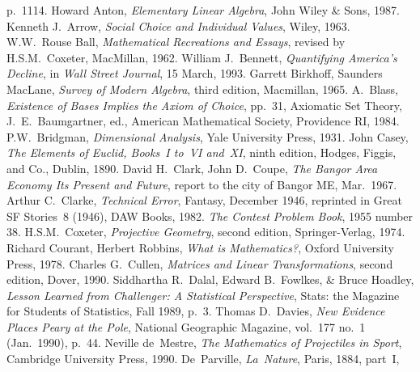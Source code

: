 \begin{thebibliography}{\makebox[2em][c]{{}\hfil{}}}
  p.~1114.
  Howard Anton,
  \emph{Elementary Linear Algebra},
  John Wiley \& Sons,
  1987.
  Kenneth J.~Arrow,
  \emph{Social Choice and Individual Values},
  Wiley,
  1963.
 W.W.~Rouse Ball,
 \emph{Mathematical Recreations and Essays},
 revised by H.S.M.~Coxeter,
 MacMillan,
 1962.
  William J.~Bennett,
  \emph{Quantifying America's Decline},
  in
  \emph{Wall Street Journal},
  15 March, 1993.
  Garrett Birkhoff, Saunders MacLane,
  \emph{Survey of Modern Algebra},
  third edition,
  Macmillan, 
  1965.
  A.~Blass,
  \emph{Existence of Bases Implies the Axiom of Choice},
  pp.\ 31,
  Axiomatic Set Theory, J.\ E.\ Baumgartner, ed.,
  American Mathematical Society,
  Providence RI, 1984.
  P.W.~Bridgman,
  \emph{Dimensional Analysis},
  Yale University Press,
  1931.
  John Casey,
  \emph{The Elements of Euclid, Books~I to~VI and~XI},
  ninth edition,
  Hodges, Figgis, and Co.,
  Dublin,
  1890.
  David H.\ Clark, John D.\ Coupe,
  \emph{The Bangor Area Economy Its Present and Future},
  report to the city of Bangor ME,
  Mar.\ 1967.
  Arthur C.~Clarke,
  \emph{Technical Error},
  Fantasy, December 1946,
  reprinted in
  Great SF Stories~8 (1946),
  DAW Books, 1982. 
  \emph{The Contest Problem Book},
  1955 number 38.
  H.S.M.~Coxeter,
  \emph{Projective Geometry},
  second edition,
  Springer-Verlag, 1974.
  Richard Courant, Herbert Robbins,
  \emph{What is Mathematics?},
  Oxford University Press, 1978.
  Charles G.\ Cullen,
  \emph{Matrices and Linear Transformations},
  second edition,
  Dover,
  1990.
  Siddhartha R.~Dalal, Edward B.~Fowlkes, \& Bruce Hoadley,
  \emph{Lesson Learned from Challenger: A Statistical Perspective},
  Stats: the Magazine for Students of Statistics,
  Fall 1989,
  p.~3.
  Thomas D.~Davies,
  \emph{New Evidence Places Peary at the Pole},
  National Geographic Magazine,
  vol.~177 no.~1 (Jan.~1990),
  p.~44.
  Neville de~Mestre,
  \emph{The Mathematics of Projectiles in Sport},
  Cambridge University Press,
  1990.
 De~Parville,
 \emph{La~Nature},
 Paris, 1884,
 part~I,

\end{thebibliography}
